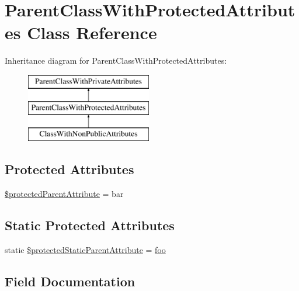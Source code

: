 \hypertarget{class_parent_class_with_protected_attributes}{}\section{Parent\+Class\+With\+Protected\+Attributes Class Reference}
\label{class_parent_class_with_protected_attributes}
Inheritance diagram for Parent\+Class\+With\+Protected\+Attributes\+:\begin{figure}[H]
\begin{center}
\leavevmode
\includegraphics[height=3.000000cm]{class_parent_class_with_protected_attributes}
\end{center}
\end{figure}
\subsection*{Protected Attributes}
\begin{DoxyCompactItemize}
\item 
\mbox{\hyperlink{class_parent_class_with_protected_attributes_a315e746027141ad0ca38d2c635659c2e}{\$protected\+Parent\+Attribute}} = \textquotesingle{}bar\textquotesingle{}
\end{DoxyCompactItemize}
\subsection*{Static Protected Attributes}
\begin{DoxyCompactItemize}
\item 
static \mbox{\hyperlink{class_parent_class_with_protected_attributes_ab02153534d362322b84e49ebb8eb166a}{\$protected\+Static\+Parent\+Attribute}} = \textquotesingle{}\mbox{\hyperlink{interfacefoo}{foo}}\textquotesingle{}
\end{DoxyCompactItemize}


\subsection{Field Documentation}
\mbox{\label{class_parent_class_with_protected_attributes_a315e746027141ad0ca38d2c635659c2e}} 

